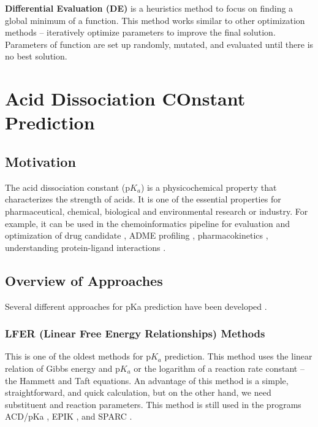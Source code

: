 \textbf{Differential Evaluation (DE)} \cite{Storn1997} is a heuristics method
to focus on finding a global minimum of a function. This method works similar
to other optimization methods -- iteratively optimize parameters to improve
the final solution. Parameters of function are set up randomly, mutated, and
evaluated until there is no best solution.

\chapter{Acid Dissociation COnstant Prediction}

\section{Motivation}

The acid dissociation constant (p$K_a$) is a physicochemical property that
characterizes the strength of acids. It is one of the essential properties
for pharmaceutical, chemical, biological and environmental research or industry.
For example, it can be used in the chemoinformatics pipeline for evaluation and
optimization of drug candidate \cite{Ishihama2002, Babic2007, Manallack2007},
ADME profiling \cite{Wan2006, Cruciani2009}, pharmacokinetics \cite{Comer2001},
understanding protein-ligand interactions \cite{Klebe2000, Lee2009}.

\section{Overview of Approaches}

Several different approaches for pKa prediction have been
developed \cite{Lee2009, Rupp2010, Fraczkiewicz2006, Ho2010}. 

\subsection{LFER (Linear Free Energy Relationships) Methods}

This is one of the oldest methods \cite{Clark1964, Perrin1981} for p$K_a$
prediction. This method uses the linear relation of Gibbs energy and p$K_a$ or
the logarithm of a reaction rate constant -- the Hammett and Taft equations.
An advantage of this method is a simple, straightforward, and quick calculation,
but on the other hand, we need substituent and reaction parameters.
This method is still used in the programs ACD/pKa \cite{acd},
EPIK \cite{Shelley2007}, and SPARC \cite{spark}.

